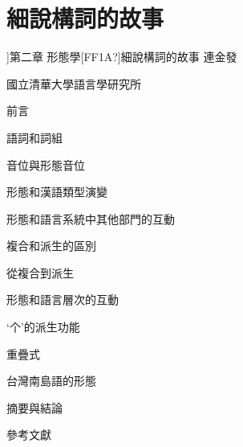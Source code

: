 
\chapter{細說構詞的故事}]{\rmfamily 第二章 形態學[FF1A?]細說構詞的故事}
\rmfamily
連金發

\rmfamily
國立清華大學語言學研究所

\begin{listWWviiiNumxleveli}
\item \begin{styleqwerty}\rmfamily
前言
\end{styleqwerty}
\item \begin{styleqwerty}\rmfamily
語詞和詞組
\end{styleqwerty}
\item \begin{styleqwerty}\rmfamily
音位與形態音位
\end{styleqwerty}
\item \begin{styleqwerty}\rmfamily
形態和漢語類型演變
\end{styleqwerty}
\item \begin{styleqwerty}\rmfamily
形態和語言系統中其他部門的互動
\end{styleqwerty}
\item \begin{styleqwerty}\rmfamily
複合和派生的區別
\end{styleqwerty}
\item \begin{styleqwerty}\rmfamily
從複合到派生
\end{styleqwerty}
\item \begin{styleqwerty}\rmfamily
形態和語言層次的互動
\end{styleqwerty}
\item \begin{styleqwerty}\rmfamily
‘个’的派生功能
\end{styleqwerty}
\item \begin{styleqwerty}\rmfamily
重疊式
\end{styleqwerty}
\item \begin{styleqwerty}\rmfamily
台灣南島語的形態
\end{styleqwerty}
\item \begin{styleqwerty}\rmfamily
摘要與結論
\end{styleqwerty}
\item \begin{styleqwerty}\rmfamily
參考文獻
\end{styleqwerty}
\end{listWWviiiNumxleveli}

